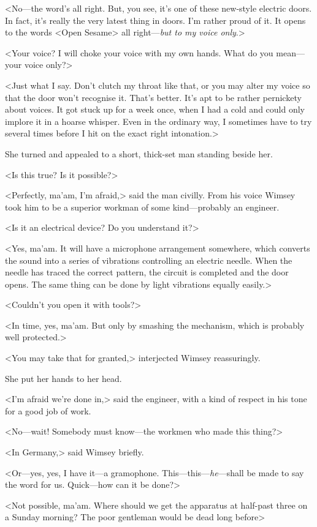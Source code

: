 <No—the word's all right. But, you see, it's one of these new-style electric doors. In fact, it's really the very latest thing in doors. I'm rather proud of it. It opens to the words <Open Sesame> all right—\emph{but to my voice only}.>

<Your voice? I will choke your voice with my own hands. What do you mean—your voice only?>

<Just what I say. Don't clutch my throat like that, or you may alter my voice so that the door won't recognise it. That's better. It's apt to be rather pernickety about voices. It got stuck up for a week once, when I had a cold and could only implore it in a hoarse whisper. Even in the ordinary way, I sometimes have to try several times before I hit on the exact right intonation.>

She turned and appealed to a short, thick-set man standing beside her.

<Is this true? Is it possible?>

<Perfectly, ma'am, I'm afraid,> said the man civilly. From his voice Wimsey took him to be a superior workman of some kind—probably an engineer.

<Is it an electrical device? Do you understand it?>

<Yes, ma'am. It will have a microphone arrangement somewhere, which converts the sound into a series of vibrations controlling an electric needle. When the needle has traced the correct pattern, the circuit is completed and the door opens. The same thing can be done by light vibrations equally easily.>

<Couldn't you open it with tools?>

<In time, yes, ma'am. But only by smashing the mechanism, which is probably well protected.>

<You may take that for granted,> interjected Wimsey reassuringly.

She put her hands to her head.

<I'm afraid we're done in,> said the engineer, with a kind of respect in his tone for a good job of work.

<No—wait! Somebody must know—the workmen who made this thing?>

<In Germany,> said Wimsey briefly.

<Or—yes, yes, I have it—a gramophone. This—this—\emph{he}—shall be made to say the word for us. Quick—how can it be done?>

<Not possible, ma'am. Where should we get the apparatus at half-past three on a Sunday morning? The poor gentleman would be dead long before\longdash>

